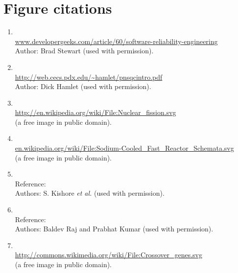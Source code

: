 \chapter*{{Figure citations}}

\doublespacing
\begin{enumerate}
\item {\bf {}}\\\url{www.developergeeks.com/article/60/software-reliability-engineering}\\
Author: Brad Stewart (used with permission).
\item {\bf {}}\\\url{http://web.cecs.pdx.edu/~hamlet/pnsqcintro.pdf}\\
Author: Dick Hamlet (used with permission).
\item {\bf {}}\\
\url{http://en.wikipedia.org/wiki/File:Nuclear_fission.svg}\\(a free image in public domain).
\item {\bf {}}\\ \url{en.wikipedia.org/wiki/File:Sodium-Cooled_Fast_Reactor_Schemata.svg}\\(a free image in public domain).

\item {\bf {}}\\Reference: \cite{sgtld-image}\\
Authors: S. Kishore \emph{et al.} (used with permission).
\item {\bf {}}\\Reference: \cite{sgdhr-image}\\
Authors: Baldev Raj and Prabhat Kumar (used with permission).
\item {\bf {}}\\\url{http://commons.wikimedia.org/wiki/File:Crossover_genes.svg}\\(a free image in public domain).
\end{enumerate}

